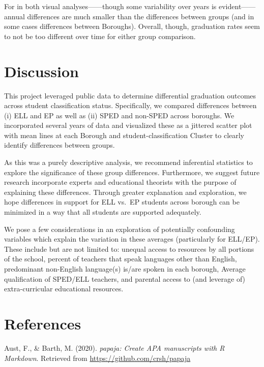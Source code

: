 \documentclass[
  english,
  man, fleqn, noextraspace]{apa6}
\begin{document}
For in both visual analyses------though some variability over years is evident------annual differences are much smaller than the differences between groups (and in some cases differences between Boroughs). Overall, though, graduation rates seem to not be too different over time for either group comparison.

\hypertarget{discussion}{%
\section{Discussion}\label{discussion}}

This project leveraged public data to determine differential graduation outcomes across student classification status. Specifically, we compared differences between (i) ELL and EP as well as (ii) SPED and non-SPED across boroughs. We incorporated several years of data and visualized these as a jittered scatter plot with mean lines at each Borough and student-classification Cluster to clearly identify differences between groups.

As this was a purely descriptive analysis, we recommend inferential statistics to explore the significance of these group differences. Furthermore, we suggest future research incorporate experts and educational theorists with the purpose of explaining these differences. Through greater explanation and exploration, we hope differences in support for ELL vs.~EP students across borough can be minimized in a way that all students are supported adequately.

We pose a few considerations in an exploration of potentially confounding variables which explain the variation in these averages (particularly for ELL/EP). These include but are not limited to: unequal access to resources by all portions of the school, percent of teachers that speak languages other than English, predominant non-English language(s) is/are spoken in each borough, Average qualification of SPED/ELL teachers, and parental access to (and leverage of) extra-curricular educational resources.

\newpage

\hypertarget{references}{%
\section{References}\label{references}}

\begingroup
\setlength{\parindent}{-0.5in}
\setlength{\leftskip}{0.5in}

\hypertarget{refs}{}
\leavevmode\hypertarget{ref-R-papaja}{}%
Aust, F., \& Barth, M. (2020). \emph{papaja: Create APA manuscripts with R Markdown}. Retrieved from \url{https://github.com/crsh/papaja}
\end{document}

